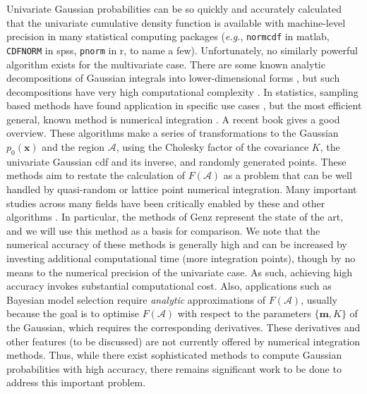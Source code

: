 \documentclass[twoside,11pt]{article}
\def\x{{\mathbf x}}
\def\m{{\mathbf m}}
\def\regionA{\mathcal{A}}
\begin{document}
Univariate Gaussian probabilities can be so quickly and accurately calculated \citep[\emph{e.g.}][]{cody69} that the univariate cumulative density function is available with machine-level precision in many statistical computing packages ({\it e.g.}, {\tt normcdf} in {\sc matlab}, {\tt CDFNORM} in {\sc spss}, {\tt pnorm} in {\sc r}, to name a few).  Unfortunately, no similarly powerful algorithm exists for the multivariate case. There are some known analytic decompositions of Gaussian integrals into lower-dimensional forms \citep{Placket1954,Curnow1962,Lazard2003}, but such decompositions have very high computational complexity \citep{Huguenin2009}. In statistics, sampling based methods have found application in specific use cases \citep{LermanManski1981,McFadden1989,Pakes1989}, but the most efficient general, known method is numerical integration \citep{genz92, drezner89, drezner94, genz99, genz99b, genz02, genz04}. A recent book \citep{genzBook} gives a good overview. These algorithms make a series of transformations to the Gaussian $p_0(\x)$ and the region $\regionA$, using the Cholesky factor of the covariance $K$, the univariate Gaussian cdf and its inverse, and randomly generated points.  These methods aim to restate the calculation of $F(\regionA)$ as a problem that can be well handled by quasi-random or lattice point numerical integration. Many important studies across many fields have been critically enabled by these and other algorithms \citep{joeMVNcdfJASA1995, Hothorn05unbiasedrecursive, Boyle05pricingoptions, Hickernell99theasymptotic, thiebautCMPB2004, zhaoCSDA2005, Buccianti_computationalinvestigations, Klerk_onapproximate, Pillow04maximumlikelihood, liaoICML2007}.   In particular, the methods of Genz represent the state of the art, and we will use this method as a basis for comparison.  We note that the numerical accuracy of these methods is generally high and can be increased by investing additional computational time (more integration points), though by no means to the numerical precision of the univariate case.  As such, achieving high accuracy invokes substantial computational cost.  Also, applications such as Bayesian model selection require \emph{analytic} approximations of $F(\regionA)$, usually because the goal is to optimise $F(\regionA)$ with respect to the parameters $\{\m,K\}$ of the Gaussian, which requires the corresponding derivatives.  These derivatives and other features (to be discussed) are not currently offered by numerical integration methods.  Thus, while there exist sophisticated methods to compute Gaussian probabilities with high accuracy, there remains significant work to be done to address this important problem.  
\end{document}
